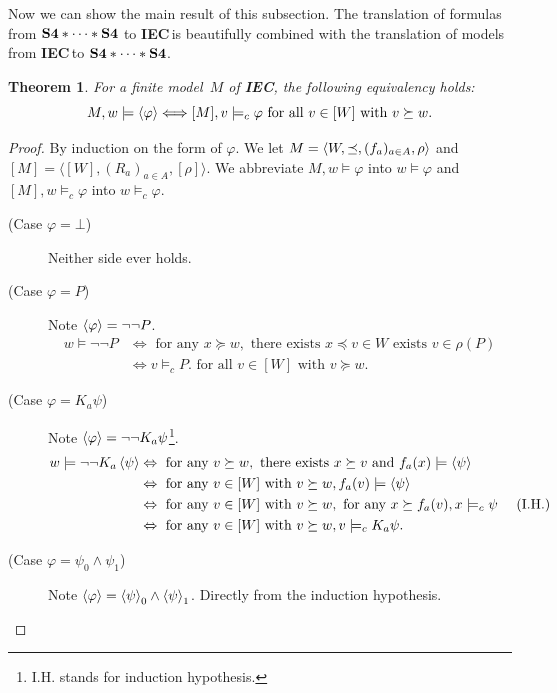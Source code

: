 \documentclass[doctor]{iscs-thesis}
\newcommand{\iec}{{\rm {\textbf{IEC}}}}
\newcommand{\ckv}{{\rm {\textbf{S4}\ast\cdots\ast\textbf{S4}}}}
\newcommand{\tuple}[1]{\langle{#1}\rangle}
\newtheorem{theorem}{Theorem}
\begin{document}
Now we can show the main result of this subsection.
The translation of formulas from $\ckv$ to \iec\,is
beautifully combined with
the translation of models from \iec\,to $\ckv$.
\begin{theorem}
 \label{modeltrans}
For a finite model~$M$ of \iec,
 the following equivalency holds:
\[
 M, w\models \left\langle{\varphi}\right\rangle
 \Longleftrightarrow
 [M], v\models_c \varphi \text{ for all }v\in [W]\text{ with }v\succeq w.
\] 
\end{theorem}
\begin{proof}
 By induction on the form of $\varphi$.
 We let $M = \model{}$ and $[M]= \tuple{[W], (R_a)_{a\in A}, [\rho]}$.
 We abbreviate $M,w \models\varphi$ into $w\models \varphi$ and
 $[M],  w\models_c\varphi$ into $ w \models_c \varphi$.
 \begin{description}
  \item[ (Case $\varphi = \bot$)]
	     Neither side ever holds.
  \item[ (Case $\varphi = P$)]
	     Note $\left\langle{\varphi}\right\rangle = \neg\neg P$.
	     \begin{align*}
	     w\models \neg\neg P &\Leftrightarrow
	      \text{ for any } x \succeq w, \text{ there exists }
	      x\preceq v \in W\text{ exists } v\in \rho(P)\\
	      &\Leftrightarrow
	      v\models_c P.\text{ for all }v\in[W]\text{ with }v\succeq w.
	     \end{align*}
  \item[ (Case $\varphi = K_a\psi$)]
	     Note $\left\langle{\varphi}\right\rangle = \neg\neg K_a\psi$\footnote{I.H. stands for induction hypothesis.}.
	     \begin{align*}
	      w\models \neg\neg K_a\left\langle{\psi}\right\rangle
	      & \Leftrightarrow
	      \text{ for any }v\succeq w,
	      \text{ there exists }x\succeq v\text{ and }
	      f_a(x)\models\left\langle{\psi}\right\rangle
	      \\ &\Leftrightarrow
	      \text{ for any }v\in [W]\text{ with }v\succeq w,
	      f_a(v)\models\left\langle{\psi}\right\rangle
	      \\ &\Leftrightarrow
	      \text{ for any }v\in [W]\text{ with }v\succeq w,
	      \text{ for any }x\succeq f_a(v),
	      x\models_c \psi
	      &\text{ (I.H.)}
	      \\ &\Leftrightarrow
	      \text{ for any }v\in [W]\text{ with }v\succeq w,
	      v\models_c K_a\psi.
	     \end{align*}
  \item[ (Case $\varphi =\psi_0\wedge\psi_1$)]
	     Note $\left\langle{\varphi}\right\rangle = \left\langle{\psi}\right\rangle_0\wedge \left\langle{\psi}\right\rangle_1$.
	     Directly from the induction hypothesis.

\end{description}
\end{proof}
\end{document}
